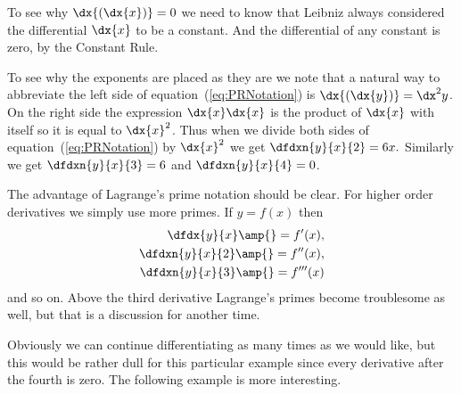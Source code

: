 To see why $\dx{(\dx{x})}=0$ we need to know that Leibniz always
considered the differential $\dx{x}$ to be a constant. And the
differential of any constant is zero, by the Constant Rule.


To see why the exponents are placed as they are we note that a
natural way to abbreviate the left side of
equation~(\ref{eq:PRNotation}) is $\dx{(\dx{y})}=\dx^2y$.  On the right
side the expression $\dx{x}\dx{x}$ is the product of $\dx{x}$ with
itself so it is equal to $\dx{x}^2$. Thus when we divide both sides of
equation~(\ref{eq:PRNotation})  by
$\dx{x}^2$ we get $\dfdxn{y}{x}{2}=6x.$  Similarly we get 
$\dfdxn{y}{x}{3} = 6$ and  $\dfdxn{y}{x}{4} = 0$.

The advantage of Lagrange's prime notation should be clear. For higher
order derivatives we simply use more primes. If $y=f(x)$ then
\begin{align*}
  \dfdx{y}{x} \amp{}= f^{\prime}(x),\\
  \dfdxn{y}{x}{2} \amp{}= f^{\prime\prime}(x),\\
  \dfdxn{y}{x}{3} \amp{}= f^{\prime\prime\prime}(x)
\end{align*}
and so on. Above the third derivative Lagrange's primes become
troublesome as well, but that is a discussion for another time.

Obviously we can continue differentiating as many times as we would
like, but this would be rather dull for this particular example since
every derivative after the fourth is zero. The following example is
more interesting.


